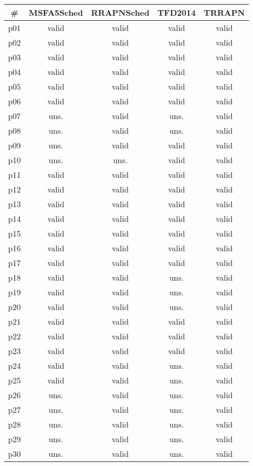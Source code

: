 \begin{tabular}{c||c|c|c|c}
\textbf{\#} & \textbf{MSFA5Sched} & \textbf{RRAPNSched} & \textbf{TFD2014} & \textbf{TRRAPN}\\
\hline
\hline
p01 & valid & valid & valid & valid\\
p02 & valid & valid & valid & valid\\
p03 & valid & valid & valid & valid\\
p04 & valid & valid & valid & valid\\
p05 & valid & valid & valid & valid\\
p06 & valid & valid & valid & valid\\
p07 & uns. & valid & uns. & valid\\
p08 & uns. & valid & uns. & valid\\
p09 & uns. & valid & valid & valid\\
p10 & uns. & uns. & valid & valid\\
p11 & valid & valid & valid & valid\\
p12 & valid & valid & valid & valid\\
p13 & valid & valid & valid & valid\\
p14 & valid & valid & valid & valid\\
p15 & valid & valid & valid & valid\\
p16 & valid & valid & valid & valid\\
p17 & valid & valid & valid & valid\\
p18 & valid & valid & uns. & valid\\
p19 & valid & valid & uns. & valid\\
p20 & valid & valid & uns. & valid\\
p21 & valid & valid & valid & valid\\
p22 & valid & valid & valid & valid\\
p23 & valid & valid & valid & valid\\
p24 & valid & valid & uns. & valid\\
p25 & valid & valid & uns. & valid\\
p26 & uns. & valid & uns. & valid\\
p27 & uns. & valid & uns. & valid\\
p28 & uns. & valid & uns. & valid\\
p29 & uns. & valid & uns. & valid\\
p30 & uns. & valid & uns. & valid\\
\end{tabular}

